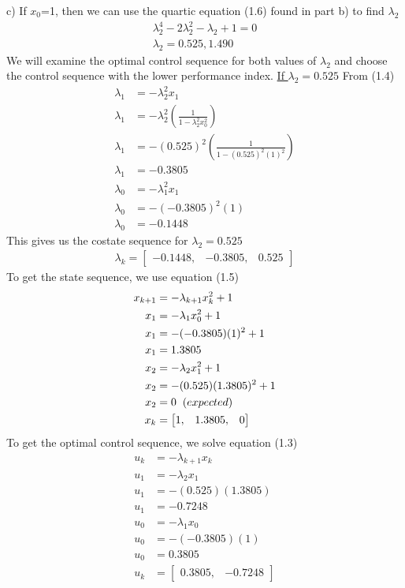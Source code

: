 \documentclass{article}
\begin{document}
  \newline \newline \noindent c) If $x_0$=1, then we can use the quartic equation (1.6) found in part b) to find $\lambda_2$
  \begin{align*}
	  \lambda_2^4-2\lambda_2^2-\lambda_2+1=0 \\
	  \lambda_2=0.525, 1.490
  \end{align*}
  We will examine the optimal control sequence for both values of $\lambda_2$ and choose the control sequence with the lower
  performance index. \newline \newline
  \underline{If $\lambda_2=0.525$}
  From (1.4)
  \begin{align*}
	  \lambda_1&=-\lambda_2^2x_1 \\
	  \lambda_1&=-\lambda_2^2(\frac{1}{1-\lambda_2^2x_0^2}) \\
	  \lambda_1&=-(0.525)^2(\frac{1}{1-(0.525)^2(1)^2}) \\
	  \lambda_1&=-0.3805 \\
	  \lambda_0&=-\lambda_1^2x_1 \\
	  \lambda_0&=-(-0.3805)^2(1) \\
	  \lambda_0&=-0.1448
  \end{align*}
  This gives us the costate sequence for $\lambda_2=0.525$
  \begin{align*}
	  \lambda_k=\begin{bmatrix}
		  -0.1448, & -0.3805, & 0.525
	  \end{bmatrix}
  \end{align*}
  To get the state sequence, we use equation (1.5)
  \begin{align*}
	  x_{k+1}&=-\lambda_{k+1}x_k^2+1 \\
	  x_1&=-\lambda_1x_0^2+1 \\
	  x_1&=-(-0.3805)(1)^2+1 \\
	  x_1&=1.3805 \\
	  x_2&=-\lambda_2x_1^2+1 \\
	  x_2&=-(0.525)(1.3805)^2+1 \\
	  x_2&=0 \hspace{2mm} (expected) \\
	  x_k&=\begin{bmatrix}
		  1, & 1.3805, & 0
	  \end{bmatrix}
  \end{align*}
  To get the optimal control sequence, we solve equation (1.3)
  \begin{align*}
	  u_k&=-\lambda_{k+1}x_k \\
	  u_1&=-\lambda_2x_1 \\
	  u_1&=-(0.525)(1.3805) \\
	  u_1&=-0.7248 \\
	  u_0&=-\lambda_1x_0 \\
	  u_0&=-(-0.3805)(1) \\
	  u_0&=0.3805 \\
	  u_k&=\begin{bmatrix}
		  0.3805, & -0.7248
	  \end{bmatrix}
  \end{align*}
\end{document}
